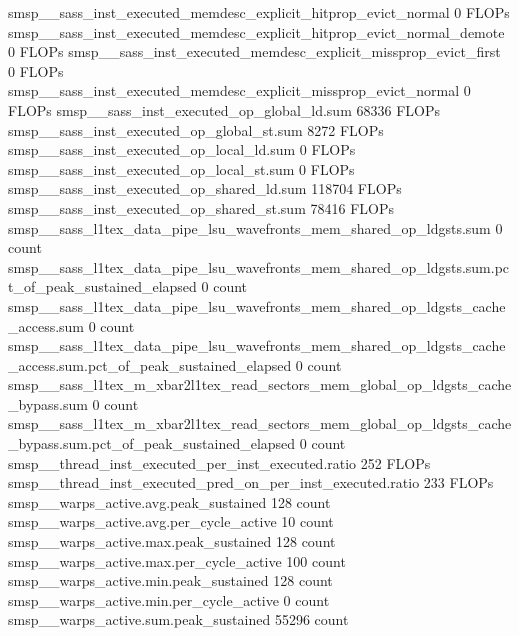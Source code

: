 smsp__sass_inst_executed_memdesc_explicit_hitprop_evict_normal                                 0 FLOPs
smsp__sass_inst_executed_memdesc_explicit_hitprop_evict_normal_demote                          0 FLOPs
smsp__sass_inst_executed_memdesc_explicit_missprop_evict_first                                 0 FLOPs
smsp__sass_inst_executed_memdesc_explicit_missprop_evict_normal                                0 FLOPs
smsp__sass_inst_executed_op_global_ld.sum                                                  68336 FLOPs
smsp__sass_inst_executed_op_global_st.sum                                                   8272 FLOPs
smsp__sass_inst_executed_op_local_ld.sum                                                       0 FLOPs
smsp__sass_inst_executed_op_local_st.sum                                                       0 FLOPs
smsp__sass_inst_executed_op_shared_ld.sum                                                 118704 FLOPs
smsp__sass_inst_executed_op_shared_st.sum                                                  78416 FLOPs
smsp__sass_l1tex_data_pipe_lsu_wavefronts_mem_shared_op_ldgsts.sum                             0 count
smsp__sass_l1tex_data_pipe_lsu_wavefronts_mem_shared_op_ldgsts.sum.pct_of_peak_sustained_elapsed               0 count
smsp__sass_l1tex_data_pipe_lsu_wavefronts_mem_shared_op_ldgsts_cache_access.sum                0 count
smsp__sass_l1tex_data_pipe_lsu_wavefronts_mem_shared_op_ldgsts_cache_access.sum.pct_of_peak_sustained_elapsed               0 count
smsp__sass_l1tex_m_xbar2l1tex_read_sectors_mem_global_op_ldgsts_cache_bypass.sum               0 count
smsp__sass_l1tex_m_xbar2l1tex_read_sectors_mem_global_op_ldgsts_cache_bypass.sum.pct_of_peak_sustained_elapsed               0 count
smsp__thread_inst_executed_per_inst_executed.ratio                                           252 FLOPs
smsp__thread_inst_executed_pred_on_per_inst_executed.ratio                                   233 FLOPs
smsp__warps_active.avg.peak_sustained                                                        128 count
smsp__warps_active.avg.per_cycle_active                                                       10 count
smsp__warps_active.max.peak_sustained                                                        128 count
smsp__warps_active.max.per_cycle_active                                                      100 count
smsp__warps_active.min.peak_sustained                                                        128 count
smsp__warps_active.min.per_cycle_active                                                        0 count
smsp__warps_active.sum.peak_sustained                                                      55296 count
